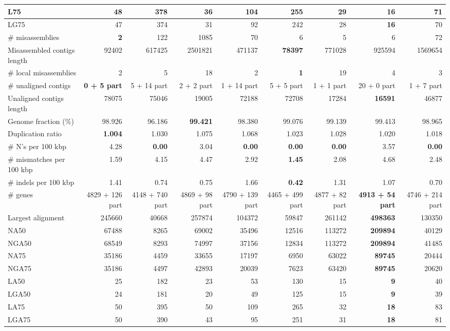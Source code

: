 \documentclass[12pt,a4paper]{article}
\begin{document}
\begin{table}[ht]
\begin{center}
\begin{tabular}{|l*{8}{|r}|}
L75 & 48 & 378 & 36 & 104 & 255 & 29 & {\bf 16} & 71 \\ \hline
LG75 & 47 & 374 & 31 & 92 & 242 & 28 & {\bf 16} & 70 \\ \hline
\# misassemblies & {\bf 2} & 122 & 1085 & 70 & 6 & 5 & 6 & 72 \\ \hline
Misassembled contigs length & 92402 & 617425 & 2501821 & 471137 & {\bf 78397} & 771028 & 925594 & 1569654 \\ \hline
\# local misassemblies & 2 & 5 & 18 & 2 & {\bf 1} & 19 & 4 & 3 \\ \hline
\# unaligned contigs & {\bf 0 + 5 part} & 5 + 14 part & 2 + 2 part & 1 + 14 part & 5 + 5 part & 1 + 1 part & 20 + 0 part & 1 + 7 part \\ \hline
Unaligned contigs length & 78075 & 75046 & 19005 & 72188 & 72708 & 17284 & {\bf 16591} & 46877 \\ \hline
Genome fraction (\%) & 98.926 & 96.186 & {\bf 99.421} & 98.380 & 99.076 & 99.139 & 99.413 & 98.965 \\ \hline
Duplication ratio & {\bf 1.004} & 1.030 & 1.075 & 1.068 & 1.023 & 1.028 & 1.020 & 1.018 \\ \hline
\# N's per 100 kbp & 4.28 & {\bf 0.00} & 3.04 & {\bf 0.00} & {\bf 0.00} & {\bf 0.00} & 3.57 & {\bf 0.00} \\ \hline
\# mismatches per 100 kbp & 1.59 & 4.15 & 4.47 & 2.92 & {\bf 1.45} & 2.08 & 4.68 & 2.48 \\ \hline
\# indels per 100 kbp & 1.41 & 0.74 & 0.75 & 1.66 & {\bf 0.42} & 1.31 & 1.07 & 0.70 \\ \hline
\# genes & 4829 + 126 part & 4148 + 740 part & 4869 + 98 part & 4790 + 139 part & 4465 + 499 part & 4877 + 82 part & {\bf 4913 + 54 part} & 4746 + 214 part \\ \hline
Largest alignment & 245660 & 40668 & 257874 & 104372 & 59847 & 261142 & {\bf 498363} & 130350 \\ \hline
NA50 & 67488 & 8265 & 69002 & 35496 & 12516 & 113272 & {\bf 209894} & 40129 \\ \hline
NGA50 & 68549 & 8293 & 74997 & 37156 & 12834 & 113272 & {\bf 209894} & 41485 \\ \hline
NA75 & 35186 & 4459 & 33655 & 17197 & 6950 & 63022 & {\bf 89745} & 20444 \\ \hline
NGA75 & 35186 & 4497 & 42893 & 20039 & 7623 & 63420 & {\bf 89745} & 20620 \\ \hline
LA50 & 25 & 182 & 23 & 53 & 130 & 15 & {\bf 9} & 40 \\ \hline
LGA50 & 24 & 181 & 20 & 49 & 125 & 15 & {\bf 9} & 39 \\ \hline
LA75 & 50 & 395 & 50 & 109 & 265 & 32 & {\bf 18} & 83 \\ \hline
LGA75 & 50 & 390 & 43 & 95 & 251 & 31 & {\bf 18} & 81 \\ \hline
\end{tabular}
\end{center}
\end{table}
\end{document}

